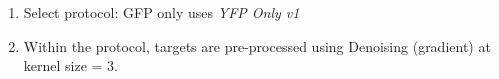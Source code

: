 \begin{enumerate}
\begin{figure}[!ht]
{    }
  \end{figure}
\item Select protocol: GFP only uses \textit{YFP Only v1}
  \begin{figure}[!ht]
    \centering
  \end{figure}
  \begin{figure}[!ht]
    \centering
  \end{figure}
\item Within the protocol, targets are pre-processed using Denoising (gradient) at kernel size = 3.
  \begin{figure}[!ht]
    \centering
    \resizebox{!}{4in}{
}
\end{figure}
\end{enumerate}
